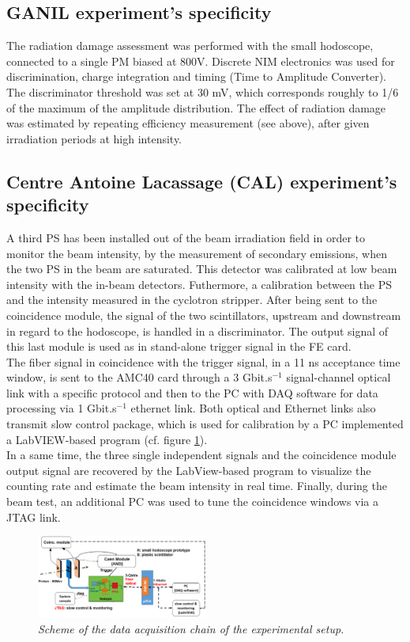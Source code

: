 \documentclass[a4paper,11pt]{article}
\begin{document}
\subsection{GANIL experiment's specificity}

The radiation damage assessment was performed with the small hodoscope, connected to a single PM biased at 800V. Discrete NIM electronics was used for discrimination, charge integration and timing (Time to Amplitude Converter). The discriminator threshold was set at 30 mV, which corresponds roughly to 1/6 of the maximum of the amplitude distribution. The effect of radiation damage was estimated by repeating efficiency measurement (see above), after given irradiation periods at high intensity.

\subsection{Centre Antoine Lacassage (CAL) experiment's specificity}
\label{In-beam_tests}

A third PS has been installed out of the beam irradiation field in order to monitor the beam intensity, by the measurement of secondary emissions, when the two PS in the beam are saturated. This detector was calibrated at low beam intensity with the in-beam detectors. Futhermore, a calibration between the PS and the intensity measured in the cyclotron stripper. After being sent to the coincidence module, the signal of the two scintillators, upstream and downstream in regard to the hodoscope, is handled in a discriminator. The output signal of this last module is used as in stand-alone trigger signal in the FE card. \\

The fiber signal in coincidence with the trigger signal, in a 11 ns acceptance time window, is sent to the AMC40 card through a 3 Gbit.s$^{-1}$ signal-channel optical link with a specific protocol and then to the PC with DAQ software for data processing via 1 Gbit.s$^{-1}$ ethernet link. Both optical and Ethernet links also transmit slow control package, which is used for calibration by a PC implemented a LabVIEW-based program (cf. figure \ref{fig:Scheme_Setup_hodo}).\\ 

In a same time, the three single independent signals and the coincidence module output signal are recovered by the LabView-based program to visualize the counting rate and estimate the beam intensity in real time.
Finally, during the beam test, an additional PC was used to tune the coincidence windows via a JTAG link.
\begin{figure}[H]
\centering
\includegraphics[width=0.5\textwidth]{figures/Scheme_Setup_Nice_08_2019.pdf}
\caption{\small{\textit{Scheme of the data acquisition chain of the experimental setup.}}}
\label{fig:Scheme_Setup_hodo}
\end{figure}
\end{document}
